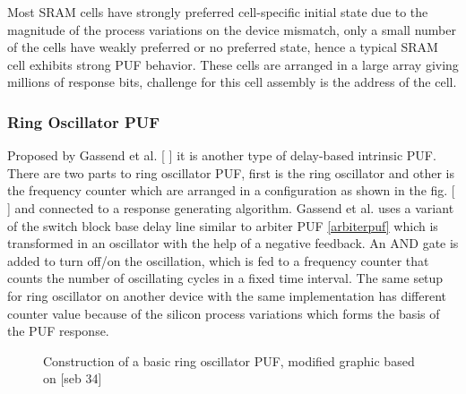Most SRAM cells have strongly preferred cell-specific initial state due to the magnitude of the process variations on the device mismatch, only a small number of the cells have weakly preferred or no preferred state, hence a typical SRAM cell exhibits strong PUF behavior. These cells are arranged in a large array giving millions of response bits, challenge for this cell assembly is the address of the cell.\\

\subsubsection{Ring Oscillator PUF}

Proposed by Gassend et al. [ ] it is another type of delay-based intrinsic PUF. There are two parts to ring oscillator PUF, first is the ring oscillator and other is the frequency counter which are arranged in a configuration as shown in the fig. [ ] and connected to a response generating algorithm. Gassend et al. uses a variant of the switch block base delay line similar to arbiter PUF \ref{arbiterpuf} which is transformed in an oscillator with the help of a negative feedback.
An AND gate is added to turn off/on the oscillation, which is fed to a frequency counter that counts the number of oscillating cycles in a fixed time interval. The same setup for ring oscillator on another device with the same implementation has different counter value because of the silicon process variations which forms the basis of the PUF response.\\

\begin{figure}
\centering
{}
\caption{Construction of a basic ring oscillator PUF, modified graphic based on [seb 34]}
\label{img:2}
\end{figure}

